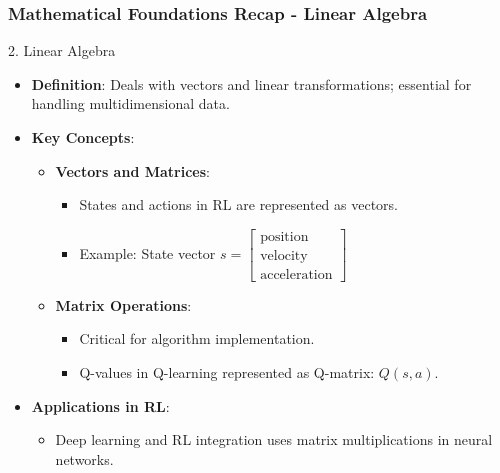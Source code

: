 \documentclass[aspectratio=169]{beamer}
\begin{document}
\begin{frame}[fragile]
    \frametitle{Mathematical Foundations Recap - Linear Algebra}
    \begin{block}{2. Linear Algebra}
        \begin{itemize}
            \item \textbf{Definition}: Deals with vectors and linear transformations; essential for handling multidimensional data.
            \item \textbf{Key Concepts}:
            \begin{itemize}
                \item \textbf{Vectors and Matrices}:
                \begin{itemize}
                    \item States and actions in RL are represented as vectors.
                    \item Example: State vector \(s = 
                    \begin{bmatrix}
                    \text{position} \\
                    \text{velocity} \\
                    \text{acceleration}
                    \end{bmatrix}\)
                \end{itemize}
                \item \textbf{Matrix Operations}:
                \begin{itemize}
                    \item Critical for algorithm implementation.
                    \item Q-values in Q-learning represented as Q-matrix: \(Q(s, a)\).
                \end{itemize}
            \end{itemize}
            \item \textbf{Applications in RL}:
            \begin{itemize}
                \item Deep learning and RL integration uses matrix multiplications in neural networks.
            \end{itemize}
        \end{itemize}
    \end{block}
\end{frame}
\end{document}
